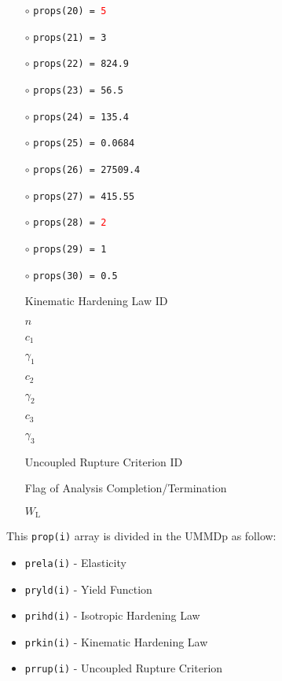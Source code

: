 \documentclass[11pt,a4paper,twoside,final,onecolumn,titlepage]{article}
\begin{document}
\noindent
\begin{minipage}{0.4\textwidth}
	\begin{itemize}
		\item[$\circ$] \texttt{props(20) = \textcolor{red}{5}}
		\item[$\circ$] \texttt{props(21) = 3}
		\item[$\circ$] \texttt{props(22) = 824.9}
		\item[$\circ$] \texttt{props(23) = 56.5}
		\item[$\circ$] \texttt{props(24) = 135.4}
		\item[$\circ$] \texttt{props(25) = 0.0684}
		\item[$\circ$] \texttt{props(26) = 27509.4}
		\item[$\circ$] \texttt{props(27) = 415.55}
		\item[$\circ$] \texttt{props(28) = \textcolor{red}{2}}
		\item[$\circ$] \texttt{props(29) = 1}
		\item[$\circ$] \texttt{props(30) = 0.5}
		\item[]
	\end{itemize}
\end{minipage}
\begin{minipage}{0.6\textwidth}
	\begin{itemize}
		\item[] Kinematic Hardening Law ID
		\item[] $n$
		\item[] $c_1$
		\item[] $\gamma_1$
		\item[] $c_2$
		\item[] $\gamma_2$
		\item[] $c_3$
		\item[] $\gamma_3$
		\item[] Uncoupled Rupture Criterion ID
		\item[] Flag of Analysis Completion/Termination
		\item[] $W_\textrm{L}$
		\item[]
	\end{itemize}
\end{minipage}

\noindent This \texttt{prop(i)} array is divided in the UMMDp as follow:
\begin{itemize}
	\item \texttt{prela(i)} - Elasticity
	\item \texttt{pryld(i)} - Yield Function
	\item \texttt{prihd(i)} - Isotropic Hardening Law
	\item \texttt{prkin(i)} -  Kinematic Hardening Law
	\item \texttt{prrup(i)} -  Uncoupled Rupture Criterion\\
\end{itemize}
\end{document}

